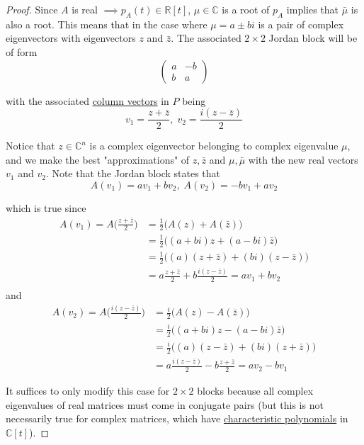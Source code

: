 	\begin{proof}
		Since $A$ is real $\implies p_A (t) \in \mathbb{R}[t]$, $\mu \in \mathbb{C}$ is a root of $p_A$ implies that $\bar{\mu}$ is also a root. This means that in the case where $\mu = a \pm b i$ is a pair of complex eigenvectors with eigenvectors $z$ and $\bar{z}$. The associated $2 \times 2$ Jordan block will be of form
		\begin{equation}
			\begin{pmatrix} a&-b\\ b&a \end{pmatrix}
		\end{equation}

		with the associated \hyperref[def:column-vector]{column vectors} in $P$ being
		\begin{equation}
			v_1 = \frac{z + \bar{z}}{2}, \; v_2 = \frac{i (z - \bar{z})}{2}
		\end{equation}

		Notice that $z \in \mathbb{C}^n$ is a complex eigenvector belonging to complex eigenvalue $\mu$, and we make the best "approximations" of $z, \bar{z}$ and $\mu, \bar{\mu}$ with the new real vectors $v_1$ and $v_2$. Note that the Jordan block states that
		\begin{equation}
			A(v_1) = a v_1 + b v_2, \; A(v_2) = -b v_1 + a v_2
		\end{equation}

		which is true since 
		\begin{align}
				A(v_1) = A\Big( \frac{z + \bar{z}}{2} \Big) & = \frac{1}{2} \big( A(z) + A(\bar{z}) \big) \\
				& = \frac{1}{2}\big( (a+bi)z + (a-bi) \bar{z} \big) \\
				& = \frac{1}{2} \big( (a)(z + \bar{z}) + (bi) (z - \bar{z})\big) \\
				& = a \frac{z + \bar{z}}{2} + b \frac{i(z-\bar{z})}{2} = a v_1 + b v_2 \\
		\end{align}
		and 
		\begin{align}
				A(v_2) = A \Big( \frac{i(z-\bar{z})}{2} \Big) & = \frac{i}{2} \big( A(z) - A(\bar{z}) \big) \\
				& = \frac{i}{2} \big( (a+bi) z - (a-bi) \bar{z}\big) \\
				& = \frac{i}{2} \big( (a) (z - \bar{z}) + (bi)(z+\bar{z})\big) \\
				& = a \frac{i(z-\bar{z})}{2} - b \frac{z + \bar{z}}{2} = a v_2 - b v_1
		\end{align}

		It suffices to only modify this case for $2 \times 2$ blocks because all complex eigenvalues of real matrices must come in conjugate pairs (but this is not necessarily true for complex matrices, which have \hyperref[def:characteristic-polynomial]{characteristic polynomials} in $\mathbb{C}[t]$). 
	\end{proof}

